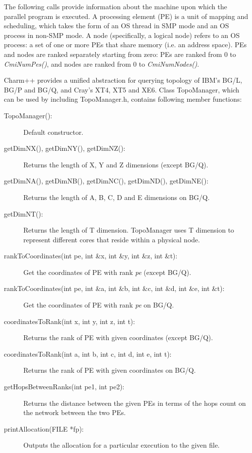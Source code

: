 The following calls provide information about the machine upon which the
parallel program is executed.
A processing element (PE) is a unit of mapping and scheduling, which takes the
form of an OS thread in SMP mode and an OS process in non-SMP mode.
A node (specifically, a logical node) refers to an OS process: a set of one or
more PEs that share memory (i.e. an address space).
PEs and nodes are ranked separately starting from zero: PEs are ranked from 0
to {\em CmiNumPes()}, and nodes are ranked from 0 to {\em CmiNumNodes()}.

Charm++ provides a unified abstraction for querying topology of IBM's BG/L, BG/P
and BG/Q, and Cray's XT4, XT5 and XE6. Class TopoManager, which can be used 
by including TopoManager.h, contains following member functions:

\begin{description}
\item [TopoManager():] Default constructor.
\item [getDimNX(), getDimNY(), getDimNZ():] Returns the length of X, Y and Z
dimensions (except BG/Q).
\item [getDimNA(), getDimNB(), getDimNC(), getDimND(), getDimNE():] Returns the
length of A, B, C, D and E dimensions on BG/Q.
\item [getDimNT():] Returns the length of T dimension. TopoManager uses T
dimension to represent different cores that reside within a physical node.
\item [rankToCoordinates(int pe, int \&x, int \&y, int \&z, int \&t):] Get the
coordinates of PE with rank {\em pe} (except BG/Q).
\item [rankToCoordinates(int pe, int \&a, int \&b, int \&c, int \&d, int \&e, int
\&t):] Get the coordinates of PE with rank {\em pe} on BG/Q.
\item [coordinatesToRank(int x, int y, int z, int t):] Returns the rank of PE
with given coordinates (except BG/Q).
\item [coordinatesToRank(int a, int b, int c, int d, int e, int t):] Returns the
rank of PE with given coordinates on BG/Q.
\item [getHopsBetweenRanks(int pe1, int pe2):] Returns the distance between the
given PEs in terms of the hops count on the network between the two PEs.
\item [printAllocation(FILE *fp):] Outputs the allocation for a particular
execution to the given file.
\end{description}

